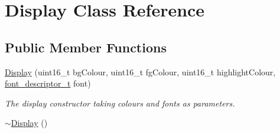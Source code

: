 \hypertarget{classDisplay}{}\section{Display Class Reference}
\label{classDisplay}
\subsection*{Public Member Functions}
\begin{DoxyCompactItemize}
\item 
\hyperlink{classDisplay_a579fdca9754b50088f77dcb7ba3489ac}{Display} (uint16\+\_\+t bg\+Colour, uint16\+\_\+t fg\+Colour, uint16\+\_\+t highlight\+Colour, \hyperlink{structfont__descriptor__t}{font\+\_\+descriptor\+\_\+t} font)
\begin{DoxyCompactList}\small\item\em The display constructor taking colours and fonts as parameters. \end{DoxyCompactList}\item 
\hyperlink{classDisplay_ac2607a6bb236c55547a4223d40d85d1f}{$\sim$\+Display} ()\hypertarget{classDisplay_ac2607a6bb236c55547a4223d40d85d1f}{}\label{classDisplay_ac2607a6bb236c55547a4223d40d85d1f}


\end{DoxyCompactItemize}
